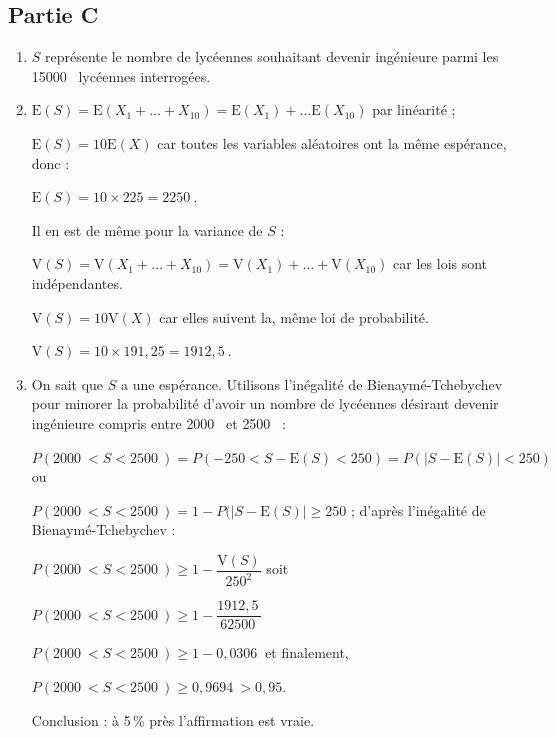 \documentclass[10pt]{article}
\providecommand{\np}[2][]{{#2~#1}}
\begin{document}
\subsection*{Partie C}
\begin{enumerate}
	\item $S$ représente le nombre de lycéennes souhaitant devenir ingénieure parmi les \np{15000} lycéennes interrogées.

	\item $\mathrm{E}(S) = \mathrm{E}(X_1 + \ldots + X_{10}) = \mathrm{E}(X_1) + \ldots \mathrm{E}(X_{10})$ par linéarité ;

	$\mathrm{E}(S) = 10\mathrm{E}(X) $ car toutes les variables aléatoires ont la même espérance, donc :

	$\mathrm{E}(S) = 10 \times 225 = \np{2250}$.

	Il en est de même pour la variance de $S$ :

	$\mathrm{V}(S) = \mathrm{V}(X_1 + \ldots + X_{10}) = \mathrm{V}(X_1) + \ldots + \mathrm{V}(X_{10})$ car les lois sont indépendantes.

	$\mathrm{V}(S) = 10\mathrm{V}(X)$ car elles suivent la, même loi de probabilité.

	$\mathrm{V}(S) = 10 \times 191,25 = \np{1912,5}$.

	\item On sait que $S$ a une espérance. Utilisons l'inégalité de Bienaymé-Tchebychev pour minorer la probabilité  d'avoir un nombre de lycéennes désirant devenir ingénieure compris entre \np{2000} et \np{2500} :

	$P(\np{2000} < S < \np{2500})  = P(- 250 <S - \mathrm{E}(S) < 250) = P(|S - \mathrm{E}(S)| < 250)$ ou

	$P(\np{2000} < S < \np{2500})  = 1 - P(|S - \mathrm{E}(S)| \geqslant 250$ ;
	d'après l'inégalité de Bienaymé-Tchebychev :

	$P(\np{2000} < S < \np{2500}) \geqslant 1 - \dfrac{\mathrm{V}(S)}{250^2}$ soit

	$P(\np{2000} < S < \np{2500}) \geqslant 1 - \dfrac{\np{1912,5}}{\np{62500}}$

	$P(\np{2000} < S < \np{2500}) \geqslant 1 - \np{0,0306}$ et finalement,

	$P(\np{2000} < S <\np{2500}) \geqslant \np{0,9694} > 0,95$.

	Conclusion : à 5\,\% près l'affirmation est vraie.

\end{enumerate}
\end{document}
